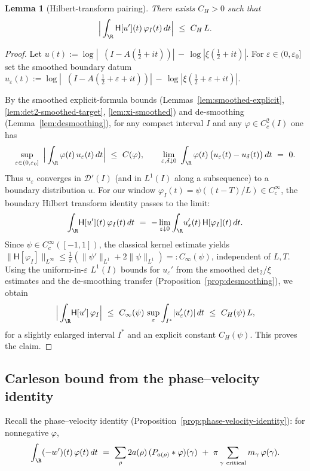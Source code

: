 \documentclass[11pt]{article}
\newtheorem{lemma}[theorem]{Lemma}
\theoremstyle{remark}
\DeclareMathOperator{\dettwo}{det_2}
\begin{document}
\begin{lemma}[Hilbert-transform pairing]\label{lem:hilbert}
There exists \(C_H>0\) such that
\[ \Big|\int_{\R} \mathsf H[u'](t)\,\varphi_I(t)\,dt\Big|\ \le\ C_H\,L.\]
\end{lemma}
\begin{proof}
Let \(u(t):=\log|\dettwo(I\!-
A(\tfrac12+it))|\,-\,\log|\xi(\tfrac12+it)|\). For \(\varepsilon\in(0,\varepsilon_0] \) set the smoothed boundary datum
\(u_\varepsilon(t):=\log|\dettwo(I\!-
A(\tfrac12+\varepsilon+it))|\,-\,\log|\xi(\tfrac12+\varepsilon+it)|\).

By the smoothed explicit-formula bounds (Lemmas~\ref{lem:smoothed-explicit}, \ref{lem:det2-smoothed-target}, \ref{lem:xi-smoothed}) and de-smoothing (Lemma~\ref{lem:desmoothing}), for any compact interval \(I\) and any \(\varphi\in C_c^2(I)\) one has
\[
 \sup_{\varepsilon\in(0,\varepsilon_0]}\ \Big|\int_{\R} \varphi(t)\,u_\varepsilon(t)\,dt\Big|\ \le\ C(\varphi),\qquad
 \lim_{\varepsilon,\delta\downarrow 0}\ \int_{\R} \varphi(t)\,\big(u_\varepsilon(t)-u_\delta(t)\big)\,dt\ =\ 0.
\]
Thus \(u_\varepsilon\) converges in \(\mathcal D'(I)\) (and in \(L^1(I)\) along a subsequence) to a boundary distribution \(u\). For our window \(\varphi_I(t)=\psi((t-T)/L)\in C_c^\infty\), the boundary Hilbert transform identity passes to the limit:
\[
 \int_{\R}\!\mathsf H[u'](t)\,\varphi_I(t)\,dt\ =\ -\lim_{\varepsilon\downarrow 0}\int_{\R}\!u_\varepsilon'(t)\,\mathsf H[\varphi_I](t)\,dt.
\]
Since \(\psi\in C_c^\infty([-1,1])\), the classical kernel estimate yields
\(\|\mathsf H[\varphi_I]\|_{L^\infty}\le \tfrac{1}{\pi}(\|\psi'\|_{L^1}+2\|\psi\|_{L^1})=:C_\infty(\psi)\), independent of \(L,T\). Using the uniform-in-\(\varepsilon\) \(L^1(I)\) bounds for \(u_\varepsilon'\) from the smoothed det$_2$/\(\xi\) estimates and the de-smoothing transfer (Proposition~\ref{prop:desmoothing}), we obtain
\[
 \Big|\int_{\R}\!\mathsf H[u']\,\varphi_I\Big|\ \le\ C_\infty(\psi)\,\sup_{\varepsilon}\int_{I^*}\!|u_\varepsilon'(t)|\,dt\ \le\ C_H(\psi)\,L,
\]
for a slightly enlarged interval \(I^*\) and an explicit constant \(C_H(\psi)\). This proves the claim.\qedhere
\end{proof}

\subsection{Carleson bound from the phase--velocity identity}
Recall the phase--velocity identity (Proposition~\ref{prop:phase-velocity-identity}): for nonnegative \(\varphi\),
\[ \int_{\R}(-w')(t)\,\varphi(t)\,dt\ =\ \sum_{\rho}2a(\rho)\,(P_{a(\rho)}*\varphi)(\gamma)\ +\ \pi\sum_{\gamma\ \mathrm{critical}} m_\gamma\,\varphi(\gamma).\]
\end{document}
